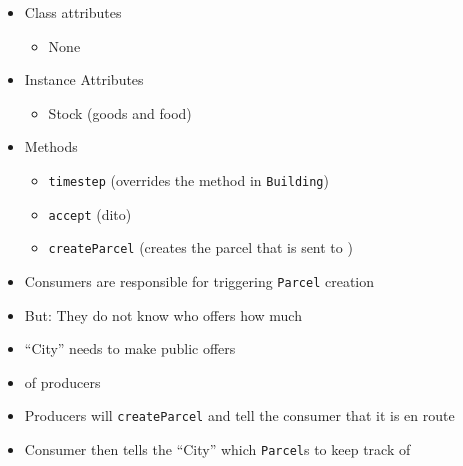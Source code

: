 \begin{frame}[fragile]
\begin{tcbraster}[raster columns=2,
                  raster equal height,
                  nobeforeafter,
                  raster column skip=0.2cm]
\begin{tcolorbox}[title=Class \texttt{Residential} (Continued)]
\end{tcolorbox}
\end{tcbraster}
%
\end{frame}


\begin{frame}
%
\begin{tcbraster}[raster columns=2,
                  raster equal height,
                  nobeforeafter,
                  raster column skip=0.5cm]
\begin{tcolorbox}[title=Class \texttt{Supermarket}]
\begin{itemize}
\item Class attributes
	\begin{itemize}
	\item None
	\end{itemize}
\item Instance Attributes
	\begin{itemize}
	\item Stock (goods and food)
	\end{itemize}
\item Methods
	\begin{itemize}
	\item \texttt{timestep} (overrides the method in \texttt{Building})
	\item \texttt{accept} (dito)
	\item \texttt{createParcel} (creates the parcel that is sent to )
	\end{itemize}
\end{itemize}
\end{tcolorbox}
%
\begin{tcolorbox}[title=Why do we need \texttt{createParcel}?]
\begin{itemize}
\item Consumers are responsible for triggering \texttt{Parcel} creation
\item But: They do not know who offers how much
\item \enquote{City} needs to make public offers
\item[\Thus]  of producers
\item Producers will \texttt{createParcel} and tell the consumer that it is en route
\item Consumer then tells the \enquote{City} which \texttt{Parcel}s to keep track of
\end{itemize}
\end{tcolorbox}
\end{tcbraster}
%
\end{frame}

